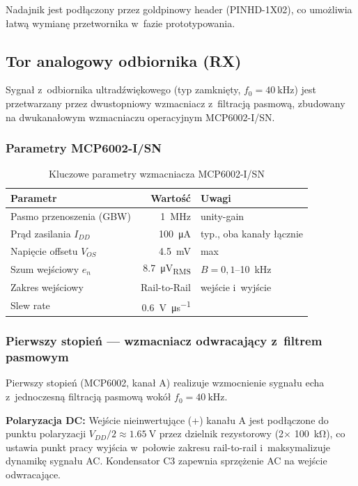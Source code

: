 \documentclass[a4paper,11pt]{article}
\begin{document}
	Nadajnik jest podłączony przez goldpinowy header (PINHD-1X02), co
	umożliwia łatwą wymianę przetwornika w~fazie prototypowania.
	
	\subsection{Tor analogowy odbiornika (RX)}
	\label{sec:tor_rx}
	
	Sygnał z~odbiornika ultradźwiękowego (typ zamknięty, $f_0 = \SI{40}{\kilo\hertz}$)
	jest przetwarzany przez dwustopniowy wzmacniacz z~filtracją pasmową, zbudowany
	na dwukanałowym wzmacniaczu operacyjnym MCP6002-I/SN.
	
	\subsubsection{Parametry MCP6002-I/SN}
	
	\begin{table}[H]
		\centering
		\caption{Kluczowe parametry wzmacniacza MCP6002-I/SN}
		\label{tab:mcp6002}
		\begin{tabular}{lrl}
			\toprule
			\textbf{Parametr} & \textbf{Wartość} & \textbf{Uwagi} \\
			\midrule
			Pasmo przenoszenia (GBW) & \SI{1}{\mega\hertz} & unity-gain \\
			Prąd zasilania $I_{DD}$ & \SI{100}{\micro\ampere} & typ., oba kanały łącznie \\
			Napięcie offsetu $V_{OS}$ & \SI{4,5}{\milli\volt} & max \\
			Szum wejściowy $e_n$ & \SI{8,7}{\micro\volt_{RMS}} & $B = 0{,}1$--\SI{10}{\kilo\hertz} \\
			Zakres wejściowy & Rail-to-Rail & wejście i~wyjście \\
			Slew rate & \SI{0,6}{\volt\per\micro\second} & \\
			\bottomrule
		\end{tabular}
	\end{table}
	
	\subsubsection{Pierwszy stopień --- wzmacniacz odwracający z~filtrem pasmowym}
	
	Pierwszy stopień (MCP6002, kanał A) realizuje wzmocnienie sygnału echa
	z~jednoczesną filtracją pasmową wokół $f_0 = \SI{40}{\kilo\hertz}$.
	
	\textbf{Polaryzacja DC:} Wejście nieinwertujące (+) kanału A jest podłączone
	do punktu polaryzacji $V_{DD}/2 \approx \SI{1,65}{\volt}$ przez dzielnik
	rezystorowy (2$\times$ \SI{100}{\kilo\ohm}), co ustawia punkt pracy wyjścia
	w~połowie zakresu rail-to-rail i~maksymalizuje dynamikę sygnału AC.
	Kondensator C3 zapewnia sprzężenie AC na wejście odwracające.
	
\end{document}
